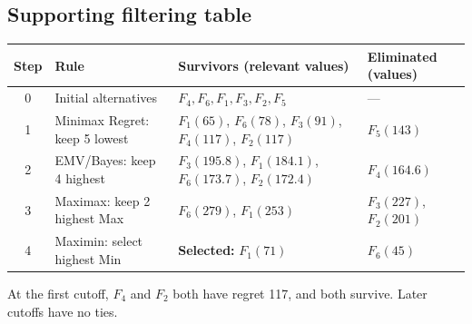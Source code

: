 \subsection*{Supporting filtering table}
\begin{center}\small
\begin{tabularx}{\textwidth}{@{}c >{\raggedright\arraybackslash}p{} >{\raggedright\arraybackslash}X >{\raggedright\arraybackslash}p{}@{}}
\toprule
Step & Rule & Survivors (relevant values) & Eliminated (values)\\\midrule
0 & Initial alternatives & $F_4,F_6,F_1,F_3,F_2,F_5$ & ---\\
1 & Minimax Regret: keep 5 lowest & $F_1(65)$, $F_6(78)$, $F_3(91)$, $F_4(117)$, $F_2(117)$ & $F_5(143)$\\
2 & EMV/Bayes: keep 4 highest & $F_3(195.8)$, $F_1(184.1)$, $F_6(173.7)$, $F_2(172.4)$ & $F_4(164.6)$\\
3 & Maximax: keep 2 highest Max & $F_6(279)$, $F_1(253)$ & $F_3(227)$, $F_2(201)$\\
4 & Maximin: select highest Min & \textbf{Selected:} $F_1(71)$ & $F_6(45)$\\
\bottomrule\end{tabularx}
\end{center}
At the first cutoff, $F_4$ and $F_2$ both have regret 117, and both survive. Later cutoffs have no ties.
\secInicio[sec:q4]

\label{sol:q4tree}
